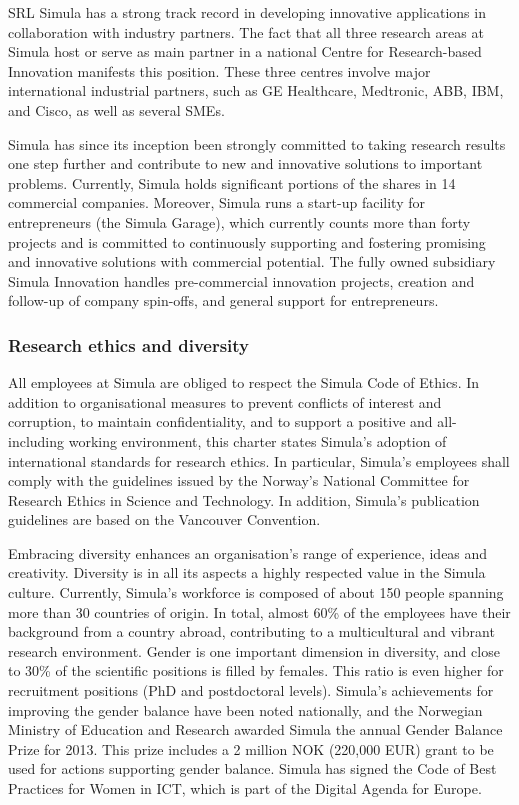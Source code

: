 \begin{sitedescription}{SRL}
Simula has a strong track record in developing innovative applications in
collaboration with industry partners. The fact that all three research areas at
Simula host or serve as main partner in a national Centre for Research-based
Innovation manifests this position. These three centres involve major
international industrial partners, such as GE Healthcare, Medtronic, ABB, IBM,
and Cisco, as well as several SMEs.

Simula has since its inception been strongly committed to taking research
results one step further and contribute to new and innovative solutions to
important problems. Currently, Simula holds significant portions of the shares
in 14 commercial companies. Moreover, Simula runs a start-up facility for
entrepreneurs (the Simula Garage), which currently counts more than forty
projects and is committed to continuously supporting and fostering promising
and innovative solutions with commercial potential. The fully owned subsidiary
Simula Innovation handles pre-commercial innovation projects, creation and
follow-up of company spin-offs, and general support for entrepreneurs.

\subsubsection*{Research ethics and diversity}

All employees at Simula are obliged to respect the Simula Code of Ethics. In
addition to organisational measures to prevent conflicts of interest and
corruption, to maintain confidentiality, and to support a positive and
all-including working environment, this charter states Simula’s adoption of
international standards for research ethics. In particular, Simula’s employees
shall comply with the guidelines issued by the Norway’s National Committee for
Research Ethics in Science and Technology. In addition, Simula’s publication
guidelines are based on the Vancouver Convention.

Embracing diversity enhances an organisation's range of experience, ideas and
creativity. Diversity is in all its aspects a highly respected value in the
Simula culture. Currently, Simula’s workforce is composed of about 150 people
spanning more than 30 countries of origin. In total, almost 60\% of the
employees have their background from a country abroad, contributing to a
multicultural and vibrant research environment. Gender is one important
dimension in diversity, and close to 30\% of the scientific positions is filled
by females. This ratio is even higher for recruitment positions (PhD and
postdoctoral levels). Simula's achievements for improving the gender balance
have been noted nationally, and the Norwegian Ministry of Education and
Research awarded Simula the annual Gender Balance Prize for 2013. This prize
includes a 2 million NOK (220,000 EUR) grant to be used for actions supporting
gender balance. Simula has signed the Code of Best Practices for Women in ICT,
which is part of the Digital Agenda for Europe.


\end{sitedescription}
